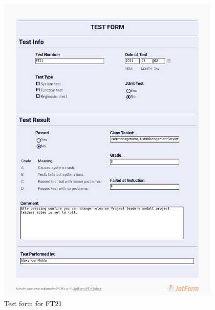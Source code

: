 \documentclass{article}
\begin{document}
 \begin{figure}
     \centering
     \includegraphics[width=13cm]{images/2021-03-02_Alexander_FT21_001}
     \renewcommand\figurename{Figure}
     \caption{Test form for FT21}
     \label{fig:my_label}
 \end{figure}
 
\end{document}
